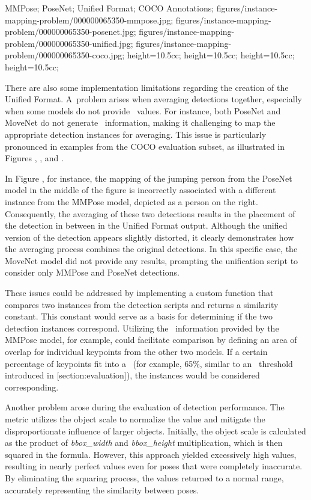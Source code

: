     {
        MMPose;
        PoseNet;
        Unified Format;
        COCO Annotations;
    }
    {
        figures/instance-mapping-problem/000000065350-mmpose.jpg;
        figures/instance-mapping-problem/000000065350-posenet.jpg;
        figures/instance-mapping-problem/000000065350-unified.jpg;
        figures/instance-mapping-problem/000000065350-coco.jpg;
    }
    {
        height=10.5cc;
        height=10.5cc;
        height=10.5cc;
        height=10.5cc;
    }

There are also some implementation limitations regarding the creation of the Unified Format. A~problem arises when averaging detections together, especially when some models do not provide \BBOX\ values. For instance, both PoseNet and MoveNet do not generate \BBOX\ information, making it challenging to map the appropriate detection instances for averaging. This issue is particularly pronounced in examples from the COCO evaluation subset, as illustrated in Figures , , and .

In Figure , for instance, the mapping of the jumping person from the PoseNet model in the middle of the figure is incorrectly associated with a different instance from the MMPose model, depicted as a person on the right. Consequently, the averaging of these two detections results in the placement of the detection in between in the Unified Format output. Although the unified version of the detection appears slightly distorted, it clearly demonstrates how the averaging process combines the original detections. In this specific case, the MoveNet model did not provide any results, prompting the unification script to consider only MMPose and PoseNet detections.

These issues could be addressed by implementing a custom function that compares two instances from the detection scripts and returns a similarity constant. This constant would serve as a basis for determining if the two detection instances correspond. Utilizing the \BBOX\ information provided by the MMPose model, for example, could facilitate comparison by defining an area of overlap for individual keypoints from the other two models. If a certain percentage of keypoints fit into a \BBOX\ (for example, 65\%, similar to an \IoU\ threshold introduced in [section:evaluation]), the instances would be considered corresponding.

Another problem arose during the evaluation of detection performance. The {\bf \OKS} metric utilizes the object scale to normalize the value and mitigate the disproportionate influence of larger objects. Initially, the object scale is calculated as the product of {\it bbox_width} and {\it bbox_height} multiplication, which is then squared in the {\bf \OKS} formula. However, this approach yielded excessively high values, resulting in nearly perfect {\bf \OKS} values even for poses that were completely inaccurate. By eliminating the squaring process, the {\bf \OKS} values returned to a normal range, accurately representing the similarity between poses.
